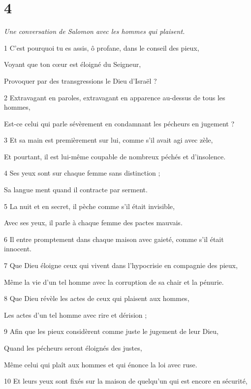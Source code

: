 \chapter{4}

\par \textit{Une conversation de Salomon avec les hommes qui plaisent.}

\par 1 C'est pourquoi tu es assis, ô profane, dans le conseil des pieux,
\par     Voyant que ton cœur est éloigné du Seigneur,
\par     Provoquer par des transgressions le Dieu d'Israël ?
\par 2 Extravagant en paroles, extravagant en apparence au-dessus de tous les hommes,
\par     Est-ce celui qui parle sévèrement en condamnant les pécheurs en jugement ?
\par 3 Et sa main est premièrement sur lui, comme s'il avait agi avec zèle,
\par     Et pourtant, il est lui-même coupable de nombreux péchés et d’insolence.
\par 4 Ses yeux sont sur chaque femme sans distinction ;
\par     Sa langue ment quand il contracte par serment.
\par 5 La nuit et en secret, il pèche comme s'il était invisible,
\par     Avec ses yeux, il parle à chaque femme des pactes mauvais.
\par 6 Il entre promptement dans chaque maison avec gaieté, comme s'il était innocent.
\par   
\par 7 Que Dieu éloigne ceux qui vivent dans l'hypocrisie en compagnie des pieux,
\par     Même la vie d'un tel homme avec la corruption de sa chair et la pénurie.
\par 8 Que Dieu révèle les actes de ceux qui plaisent aux hommes,
\par     Les actes d'un tel homme avec rire et dérision ;
\par 9 Afin que les pieux considèrent comme juste le jugement de leur Dieu,
\par     Quand les pécheurs seront éloignés des justes,
\par     Même celui qui plaît aux hommes et qui énonce la loi avec ruse.
\par 10 Et leurs yeux sont fixés sur la maison de quelqu'un qui est encore en sécurité,
